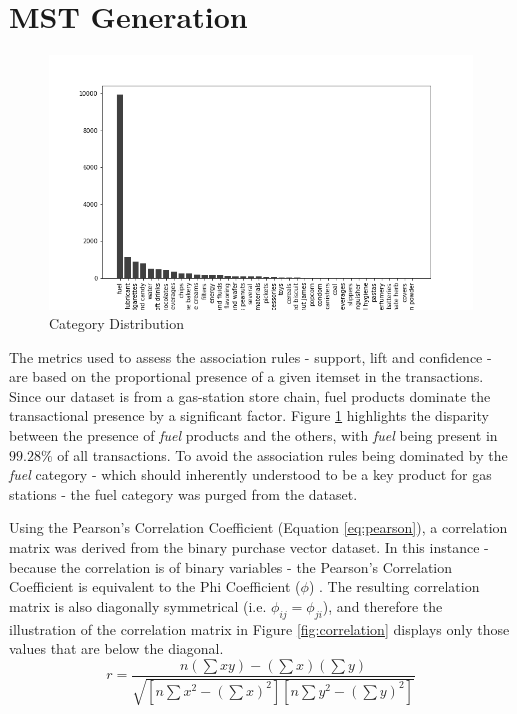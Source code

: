 \documentclass[paper=a4,fontsize=11pt]{report}	%
\begin{document}
\section{MST Generation}
\begin{figure}[H]
\centering
\includegraphics[scale=0.5]{category_dist}
\caption{Category Distribution}
\label{fig:cat_dist}
\end{figure}
The metrics used to assess the association rules - support, lift and confidence - are based on the proportional presence of a given itemset in the transactions. Since our dataset is from a gas-station store chain, fuel products dominate the transactional presence by a significant factor. Figure \ref{fig:cat_dist} highlights the disparity between the presence of \textit{fuel} products and the others, with \textit{fuel} being present in $99.28\%$ of all transactions. To avoid the association rules being dominated by the \textit{fuel} category - which should inherently understood to be a key product for gas stations - the fuel category was purged from the dataset.

Using the Pearson's Correlation Coefficient (Equation \ref{eq:pearson}), a correlation matrix was derived from the binary purchase vector dataset. In this instance - because the correlation is of binary variables - the Pearson's Correlation Coefficient is equivalent to the Phi Coefficient ($\phi$) \cite{phi}. The resulting correlation matrix is also diagonally symmetrical (i.e. $\phi_{ij} = \phi_{ji}$), and therefore the illustration of the correlation matrix in Figure \ref{fig:correlation} displays only those values that are below the diagonal.
\begin{equation}
\label{eq:pearson}
r = \frac{ n(\sum xy) - (\sum x) (\sum y)} { \sqrt{ [n\sum x^2 - (\sum x)^2] [n \sum y^2 - (\sum y)^2] } }
\end{equation}
\end{document}

